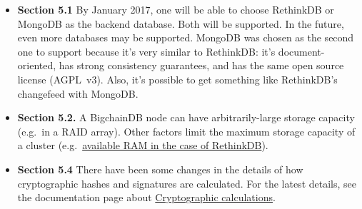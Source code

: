 \documentclass[a4paper]{article}
\begin{document}
\begin{itemize}
  \item \textbf{Section 5.1} By January 2017, one will be able to choose RethinkDB or MongoDB as the backend database. Both will be supported. In the future, even more databases may be supported. MongoDB was chosen as the second one to support because it's very similar to RethinkDB: it's document-oriented, has strong consistency guarantees, and has the same open source license (AGPL~v3). Also, it's possible to get something like RethinkDB's changefeed with MongoDB.

  \item \textbf{Section 5.2.} A BigchainDB node can have arbitrarily-large storage capacity (e.g.~in a RAID array). Other factors limit the maximum storage capacity of a cluster (e.g.~\href{https://bigchaindb.readthedocs.io/en/latest/nodes/node-requirements.html#memory-ram-requirements}{available RAM in the case of RethinkDB}).

  \item \textbf{Section 5.4} There have been some changes in the details of how cryptographic hashes and signatures are calculated. For the latest details, see the documentation page about \href{https://docs.bigchaindb.com/projects/server/en/master/appendices/cryptography.html}{Cryptographic calculations}.

\end{itemize}
\end{document}
